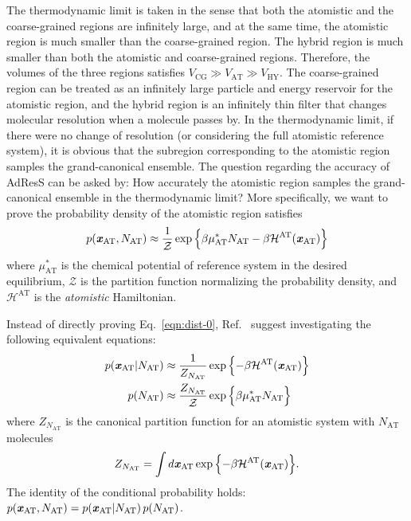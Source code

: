 \documentclass[epjST]{svjour}
\newcommand{\vect}[1]{\textbf{\textit{#1}}}
\newcommand{\mh}[0]{\mathcal {H}}
\newcommand{\AT}[0]{\textrm{AT}}
\newcommand{\HY}[0]{\textrm{HY}}
\newcommand{\CG}[0]{\textrm{CG}}
\begin{document}
The thermodynamic limit is taken in the sense that both the atomistic
and the coarse-grained regions are infinitely large, and at the same
time, the atomistic region is much smaller than the coarse-grained
region. The hybrid region is much smaller than both the atomistic and
coarse-grained regions.  Therefore, the volumes of the
three regions satisfies $V_\CG\gg V_\AT\gg V_\HY$.  The coarse-grained
region can be treated as an infinitely large particle and energy
reservoir for the atomistic region, and the hybrid region is an
infinitely thin filter that changes molecular resolution when a
molecule passes by. In the
thermodynamic limit, if there were no change of resolution (or
considering the full atomistic reference system), it is obvious that
the subregion corresponding to the atomistic region samples the
grand-canonical ensemble.  The question regarding the accuracy of
AdResS can be asked by: How accurately the atomistic region samples
the grand-canonical ensemble in the thermodynamic limit? More
specifically, we want to prove the probability density of the atomistic region satisfies
\begin{align}\label{eqn:dist-0}
  p(\vect x_\AT, N_\AT) \approx \frac{1}{\mathcal Z} \exp\Big\{{\beta\mu^\ast_\AT N_\AT - \beta \mh^\AT(\vect x_\AT)} \Big\}
\end{align}
where $\mu^\ast_\AT$ is the chemical potential of reference system in
the desired equilibrium, $\mathcal Z$ is the partition function
normalizing the probability density, and $\mh^\AT$ is the \emph{atomistic}
Hamiltonian.

Instead of directly proving Eq.~\eqref{eqn:dist-0}, Ref.~\cite{wang2013grand}
suggest investigating the following equivalent equations:
\begin{align}\label{eqn:dist-1-0}
  p(\vect x_\AT \vert N_\AT) &\approx \frac{1}{Z_{N_\AT}} \exp\Big\{{- \beta \mh^\AT(\vect x_\AT)}\Big\}  \\\label{eqn:dist-1-1}
  p(N_\AT) & \approx \frac{ Z_{N_\AT}}{\mathcal Z} \exp\Big\{{\beta\mu^\ast_\AT N_\AT}\Big\}
\end{align}
where $Z_{N_\AT}$ is the canonical partition function for an atomistic
system with $N_\AT$ molecules
\begin{align}
  Z_{N_\AT} = \int d\vect x_{\AT} \exp\Big\{{- \beta \mh^\AT(\vect x_\AT)}\Big\}.
\end{align}
The identity of the conditional probability holds: $ p(\vect x_\AT, N_\AT)  = p(\vect x_\AT \vert N_\AT) \, p(N_\AT) $.
\end{document}
